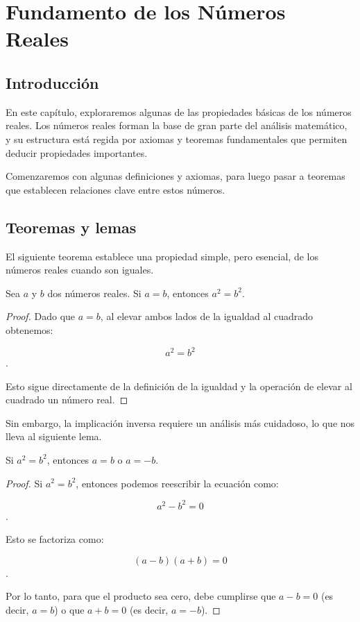 \chapter{Fundamento de los Números Reales}

\section{Introducción}

En este capítulo, exploraremos algunas de las propiedades básicas de los números reales. Los números reales forman la base de gran parte del análisis matemático, y su estructura está regida por axiomas y teoremas fundamentales que permiten deducir propiedades importantes.

Comenzaremos con algunas definiciones y axiomas, para luego pasar a teoremas que establecen relaciones clave entre estos números.

\section{Teoremas y lemas}

El siguiente teorema establece una propiedad simple, pero esencial, de los números reales cuando son iguales.

\begin{theorem}
Sea $a$ y $b$ dos números reales. Si $a = b$, entonces $a^2 = b^2$.
\end{theorem}

\begin{proof}
Dado que $a = b$, al elevar ambos lados de la igualdad al cuadrado obtenemos:

$$a^2 = b^2$$.

Esto sigue directamente de la definición de la igualdad y la operación de elevar al cuadrado un número real.
\end{proof}

Sin embargo, la implicación inversa requiere un análisis más cuidadoso, lo que nos lleva al siguiente lema.

\begin{lemma}
Si $a^2 = b^2$, entonces $a = b$ o $a = -b$.
\end{lemma}

\begin{proof}
Si $a^2 = b^2$, entonces podemos reescribir la ecuación como:

$$a^2 - b^2 = 0$$.

Esto se factoriza como:

$$(a - b)(a + b) = 0$$.

Por lo tanto, para que el producto sea cero, debe cumplirse que $a - b = 0$ (es decir, $a = b$) o que $a + b = 0$ (es decir, $a = -b$).
\end{proof}

